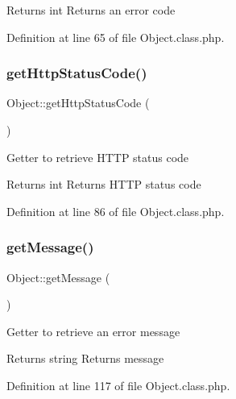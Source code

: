 \begin{DoxyReturn}{Returns}
int Returns an error code 
\end{DoxyReturn}


Definition at line 65 of file Object.\+class.\+php.

\hypertarget{classObject_a5cb4abc24dd01e04c24da487d476efc0}{}\label{classObject_a5cb4abc24dd01e04c24da487d476efc0} 
\subsubsection{\texorpdfstring{get\+Http\+Status\+Code()}{getHttpStatusCode()}}
{\footnotesize\ttfamily Object\+::get\+Http\+Status\+Code (\begin{DoxyParamCaption}{ }\end{DoxyParamCaption})}

Getter to retrieve H\+T\+TP status code

\begin{DoxyReturn}{Returns}
int Returns H\+T\+TP status code 
\end{DoxyReturn}


Definition at line 86 of file Object.\+class.\+php.

\hypertarget{classObject_a813487b153bfe18102ac76d8c718999f}{}\label{classObject_a813487b153bfe18102ac76d8c718999f} 
\subsubsection{\texorpdfstring{get\+Message()}{getMessage()}}
{\footnotesize\ttfamily Object\+::get\+Message (\begin{DoxyParamCaption}{ }\end{DoxyParamCaption})}

Getter to retrieve an error message

\begin{DoxyReturn}{Returns}
string Returns message 
\end{DoxyReturn}


Definition at line 117 of file Object.\+class.\+php.

\hypertarget{classObject_afe1fe6fc005389cd616a5e9105de977a}{}\label{classObject_afe1fe6fc005389cd616a5e9105de977a} 
